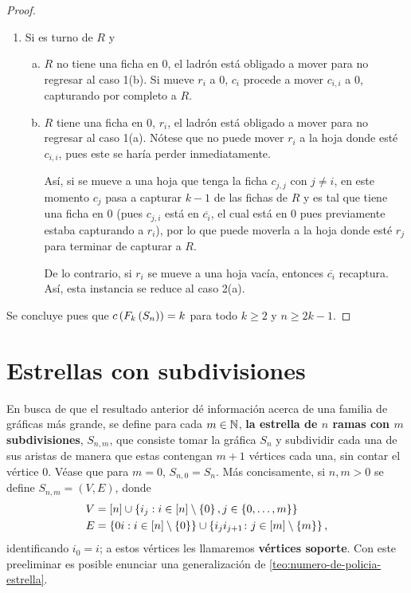 \begin{proof}
\begin{enumerate}
        \item Si es turno de $R$ y
        \begin{enumerate}[(a)]
            \item $R$ no tiene una ficha en $0$, el ladr\'on est\'a obligado a
            mover para no regresar al caso 1(b). Si mueve $r_i$ a $0$, $c_i$
            procede a mover $c_{i,i}$ a $0$, capturando por completo a $R$.
            
            \item $R$ tiene una ficha en $0$, $r_i$, el ladr\'on est\'a obligado
            a mover para no regresar al caso 1(a). N\'otese que no puede mover
            $r_i$ a la hoja donde est\'e $c_{i,i}$, pues este se har\'ia perder
            inmediatamente.
            
            As\'i, si se mueve a una hoja que tenga la ficha $c_{j,j}$ con
            $j\neq i$, en este momento $c_j$ pasa a capturar $k-1$ de las fichas
            de $R$ y es tal que tiene una ficha en $0$ (pues $c_{j,i}$ est\'a en
            $\overline{c_i}$, el cual est\'a en $0$ pues previamente estaba
            capturando a $r_i$), por lo que puede moverla a la hoja donde est\'e
            $r_j$ para terminar de capturar a $R$.

            De lo contrario, si $r_i$ se mueve a una hoja vac\'ia, entonces
            $\overline{c_i}$ recaptura. As\'i, esta instancia se reduce al caso
            2(a).
        \end{enumerate}
    \end{enumerate}
    Se concluye pues que $c\left( F_k\left( S_n\right)\right)=k$ para todo $k\geq 2$ y
    $n\geq 2k-1$.
    
\end{proof}

\section{Estrellas con subdivisiones}

En busca de que el resultado anterior d\'e informaci\'on acerca de una familia
de gr\'aficas m\'as grande, se define para cada $m\in \mathbb{N}$, \textbf{la estrella
de $n$ ramas con $m$ subdivisiones}, $S_{n,m}$, que consiste tomar la gr\'afica
$S_n$ y subdividir cada una de sus aristas de manera que estas contengan $m+1$
v\'ertices cada una, sin contar el v\'ertice $0$. V\'ease que para $m=0$,
$S_{n,0}=S_n$. M\'as concisamente, si $n,m > 0$ se define $S_{n,m}=(V,E)$, donde
\begin{align*}
    V &=\left[ n\right]\cup\left\{ i_j: i\in\left[ n\right]\setminus \left\{ 0\right\} , j\in \left\{ 0,\dots, m\right\}\right\} \\
    E &=\left\{ 0i : i\in \left[ n\right]\setminus\left\{ 0\right\}\right\} \cup \left\{ i_ji_{j+1} \colon j \in \left[ m\right]
    \setminus\left\{ m\right\}\right\},
\end{align*}
identificando $i_0=i$; a estos v\'ertices les llamaremos \textbf{v\'ertices
soporte}. Con este preeliminar es posible enunciar una generalizaci\'on de
\cref{teo:numero-de-policia-estrella}.

